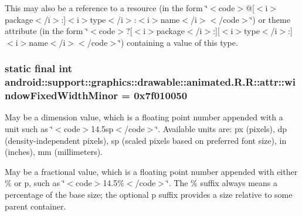 This may also be a reference to a resource (in the form \char`\"{}$<$code$>$@\mbox{[}$<$i$>$package$<$/i$>$:\mbox{]}$<$i$>$type$<$/i$>$:$<$i$>$name$<$/i$>$$<$/code$>$\char`\"{}) or theme attribute (in the form \char`\"{}$<$code$>$?\mbox{[}$<$i$>$package$<$/i$>$:\mbox{]}\mbox{[}$<$i$>$type$<$/i$>$:\mbox{]}$<$i$>$name$<$/i$>$$<$/code$>$\char`\"{}) containing a value of this type. \hypertarget{classandroid_1_1support_1_1graphics_1_1drawable_1_1animated_1_1_r_1_1attr_d06740d6c319f7c10ca13a909cad4be5}{
\subsubsection[{windowFixedWidthMinor}]{\setlength{\rightskip}{0pt plus 5cm}static final int android::support::graphics::drawable::animated.R.R::attr::windowFixedWidthMinor = 0x7f010050}}
\label{classandroid_1_1support_1_1graphics_1_1drawable_1_1animated_1_1_r_1_1attr_d06740d6c319f7c10ca13a909cad4be5}


May be a dimension value, which is a floating point number appended with a unit such as \char`\"{}$<$code$>$14.5sp$<$/code$>$\char`\"{}. Available units are: px (pixels), dp (density-independent pixels), sp (scaled pixels based on preferred font size), in (inches), mm (millimeters). 

May be a fractional value, which is a floating point number appended with either \% or p, such as \char`\"{}$<$code$>$14.5\%$<$/code$>$\char`\"{}. The \% suffix always means a percentage of the base size; the optional p suffix provides a size relative to some parent container. 

